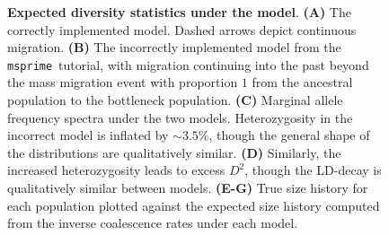 \documentclass{article}
\newcommand{\msprime}[0]{\texttt{msprime}}
\begin{document}
\begin{figure}[ht]
\begin{center}
\caption{\textbf{Expected diversity statistics under the \citet{gutenkunst2009inferring} model}.
    \textbf{(A)} The correctly implemented model. Dashed arrows depict continuous migration.
    \textbf{(B)} The incorrectly implemented model from the \msprime\ tutorial, with migration continuing
    into the past beyond the mass migration event with proportion $1$ from the ancestral population
    to the bottleneck population.
    \textbf{(C)} Marginal allele frequency spectra under the two models. Heterozygosity in the incorrect model
    is inflated by $\sim3.5\%$, though the general shape of the distributions are qualitatively similar.
    \textbf{(D)} Similarly, the increased heterozygosity leads to excess $D^2$, though the LD-decay is
    qualitatively similar between models.
    \textbf{(E-G)} True size history for each population plotted against the expected size history computed
    from the inverse coalescence rates under each model.
}
\label{fig:ooa_stats}
\end{center}
\end{figure}
\end{document}
